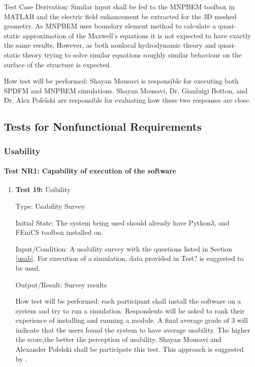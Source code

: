 \documentclass[12pt, titlepage]{article}
\begin{document}
\begin{enumerate}
Test Case Derivation: Similar input shall be fed to the MNPBEM toolbox in  MATLAB and the electric field enhancement be extracted for the 3D meshed geometry. As MNPBEM uses boundary element method to calculate a quasi-static approximation of the Maxwell's equations it is not expected to have exactly the same results. However, as both nonlocal hydrodynamic theory and quasi-static theory trying to solve similar equations roughly similar behaviour on the surface of the structure is expected.     

How test will be performed: Shayan Mousavi is responsible for executing both SPDFM and MNPBEM simulations. Shayan Mousavi, Dr. Gianluigi Botton, and Dr. Alex Pofelski are responsible for evaluating how these two responses are close.


\end{enumerate}
	

\subsection{Tests for Nonfunctional Requirements}
\label{nonfunc}

\subsubsection{Usability}
		
\paragraph{Test NR1: Capability of execution of the software}

\begin{enumerate}

\item{\textbf{Test 19:} Usibility \\}

Type: Usability Survey
					
Initial State: The system being used should already have Python3, and FEniCS toolbox installed on.  
					
Input/Condition: A usability survey with the questions listed in Section \ref{usab}. For execution of a simulation, data provided in Test? is suggested to be used.
					
Output/Result: Survey results
					
How test will be performed: each participant shall install the software on a system and try to run a simulation. Respondents will be asked to rank their experience of installing and running a module. A final average grade of 3 will indicate that the users found the system to have average usability. The higher the score,the better the perception of usability. Shayan Mousavi and Alexander Pofelski shall be participate this test. This approach is suggested by \cite{LatticeB41:online}.

\end{enumerate}
\end{document}
